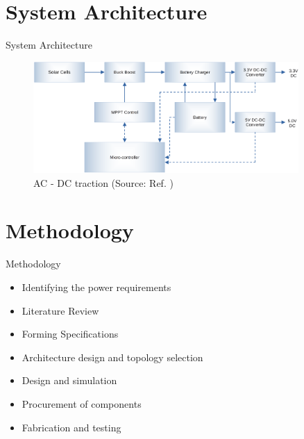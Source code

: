 \documentclass[aspectratio=169]{beamer}
\begin{document}
\section{System Architecture}
\begin{frame}{System Architecture}
	
	\begin{figure}[h]
		\centering
		\includegraphics[width=0.9\textwidth]{blk diag.png}
		\caption{AC - DC traction (Source: Ref. \cite{p1})	}
		\label{fig:mesh1}
	\end{figure}

	
\end{frame}

\section{Methodology}

	
	
	
	

\begin{frame}{Methodology}
		\begin{itemize}
			
			\item Identifying the power requirements
			\item Literature Review
			\item Forming Specifications
			\item Architecture design and topology selection
			\item Design and simulation
			\item Procurement of components
			\item Fabrication and testing
		
		\end{itemize} 
	
\end{frame}
\end{document}
